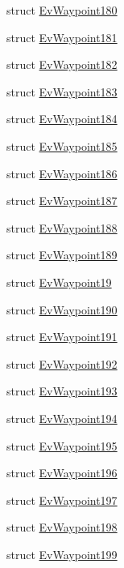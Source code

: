 \begin{DoxyCompactItemize}
struct \hyperlink{structmove__base__z__client_1_1EvWaypoint180}{Ev\+Waypoint180}
\item 
struct \hyperlink{structmove__base__z__client_1_1EvWaypoint181}{Ev\+Waypoint181}
\item 
struct \hyperlink{structmove__base__z__client_1_1EvWaypoint182}{Ev\+Waypoint182}
\item 
struct \hyperlink{structmove__base__z__client_1_1EvWaypoint183}{Ev\+Waypoint183}
\item 
struct \hyperlink{structmove__base__z__client_1_1EvWaypoint184}{Ev\+Waypoint184}
\item 
struct \hyperlink{structmove__base__z__client_1_1EvWaypoint185}{Ev\+Waypoint185}
\item 
struct \hyperlink{structmove__base__z__client_1_1EvWaypoint186}{Ev\+Waypoint186}
\item 
struct \hyperlink{structmove__base__z__client_1_1EvWaypoint187}{Ev\+Waypoint187}
\item 
struct \hyperlink{structmove__base__z__client_1_1EvWaypoint188}{Ev\+Waypoint188}
\item 
struct \hyperlink{structmove__base__z__client_1_1EvWaypoint189}{Ev\+Waypoint189}
\item 
struct \hyperlink{structmove__base__z__client_1_1EvWaypoint19}{Ev\+Waypoint19}
\item 
struct \hyperlink{structmove__base__z__client_1_1EvWaypoint190}{Ev\+Waypoint190}
\item 
struct \hyperlink{structmove__base__z__client_1_1EvWaypoint191}{Ev\+Waypoint191}
\item 
struct \hyperlink{structmove__base__z__client_1_1EvWaypoint192}{Ev\+Waypoint192}
\item 
struct \hyperlink{structmove__base__z__client_1_1EvWaypoint193}{Ev\+Waypoint193}
\item 
struct \hyperlink{structmove__base__z__client_1_1EvWaypoint194}{Ev\+Waypoint194}
\item 
struct \hyperlink{structmove__base__z__client_1_1EvWaypoint195}{Ev\+Waypoint195}
\item 
struct \hyperlink{structmove__base__z__client_1_1EvWaypoint196}{Ev\+Waypoint196}
\item 
struct \hyperlink{structmove__base__z__client_1_1EvWaypoint197}{Ev\+Waypoint197}
\item 
struct \hyperlink{structmove__base__z__client_1_1EvWaypoint198}{Ev\+Waypoint198}
\item 
struct \hyperlink{structmove__base__z__client_1_1EvWaypoint199}{Ev\+Waypoint199}

\end{DoxyCompactItemize}
